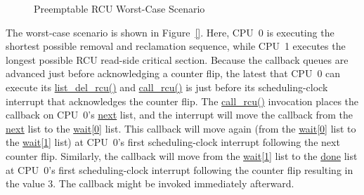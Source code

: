 \begin{figure}[htb]
\begin{center}
\end{center}
\caption{Preemptable RCU Worst-Case Scenario}
\label{app:rcuimpl:Preemptable RCU Worst-Case Scenario}
\end{figure}

The worst-case scenario is shown in
Figure~\ref{}.
Here, CPU~0 is executing the shortest possible
removal and reclamation sequence,
while CPU~1 executes the longest possible RCU read-side critical
section.
Because the callback queues are advanced just before acknowledging a
counter flip, the latest that CPU~0 can execute its
\url{list_del_rcu()} and \url{call_rcu()} is just before
its scheduling-clock interrupt that acknowledges the counter flip.
The \url{call_rcu()} invocation places the callback on CPU~0's
\url{next} list, and the interrupt will move the callback from
the \url{next} list to the \url{wait[0]} list.
This callback will move again (from the \url{wait[0]} list
to the \url{wait[1]} list) at CPU~0's first scheduling-clock
interrupt following the next counter flip.
Similarly, the callback will move from the \url{wait[1]} list
to the \url{done} list at CPU~0's first scheduling-clock
interrupt following the counter flip resulting in the value 3.
The callback might be invoked immediately afterward.

